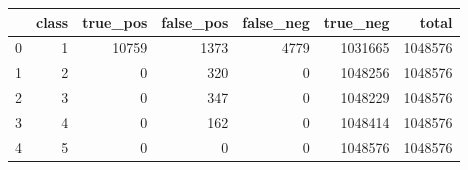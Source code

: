 \begin{tabular}{lrrrrrr}
\toprule
 & class & true_pos & false_pos & false_neg & true_neg & total \\
\midrule
0 & 1 & 10759 & 1373 & 4779 & 1031665 & 1048576 \\
1 & 2 & 0 & 320 & 0 & 1048256 & 1048576 \\
2 & 3 & 0 & 347 & 0 & 1048229 & 1048576 \\
3 & 4 & 0 & 162 & 0 & 1048414 & 1048576 \\
4 & 5 & 0 & 0 & 0 & 1048576 & 1048576 \\
\bottomrule
\end{tabular}
